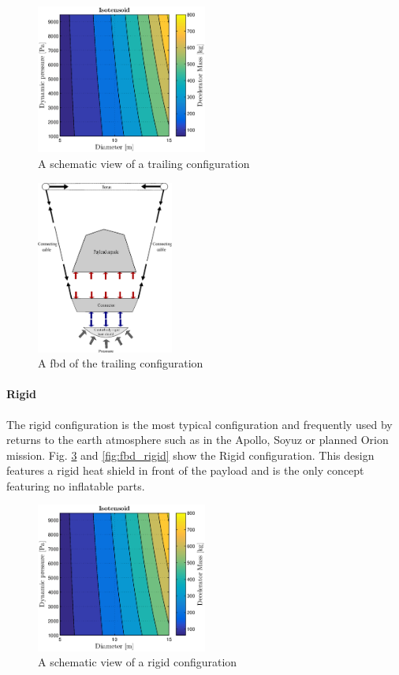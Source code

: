 \begin{figure}[H]
\centering
\includegraphics[width = 0.5\textwidth]{Figure/ISO_comp.eps}
\caption{A schematic view of a trailing configuration}
\label{fig:conc_trailing}
\end{figure}

\begin{figure}[H]
\centering
\includegraphics[width = 0.4\textwidth]{Figure/FBD_trailing.eps}
\caption{A \gls{fbd} of the trailing configuration}
\label{fig:fbd_trailing}
\end{figure}

\paragraph{Rigid}

The rigid configuration is the most typical configuration and frequently used by returns to the earth atmosphere such as in the Apollo, Soyuz or planned Orion mission. Fig. \ref{fig:conc_rigid} and \ref{fig:fbd_rigid} show the Rigid configuration. This design features a rigid heat shield in front of the payload and is the only concept featuring no inflatable parts.

\begin{figure}[H]
\centering
\includegraphics[width = 0.5\textwidth]{Figure/ISO_comp.eps}
\caption{A schematic view of a rigid configuration}
\label{fig:conc_rigid}
\end{figure}

